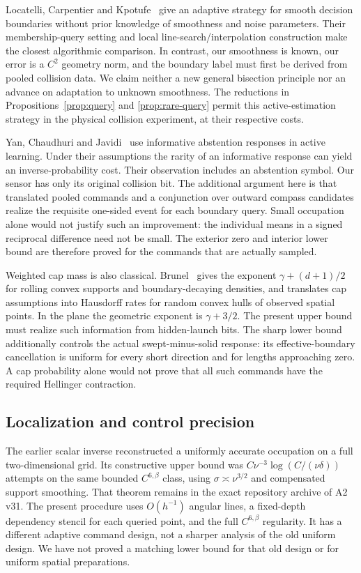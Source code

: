 Locatelli, Carpentier and Kpotufe~\cite{LCK} give an adaptive strategy
for smooth decision boundaries without prior knowledge of smoothness
and noise parameters. Their membership-query setting and local
line-search/interpolation construction make the closest algorithmic
comparison. In contrast, our smoothness is known, our error is a $C^2$
geometry norm, and the boundary label must first be derived from
pooled collision data. We claim neither a new general
bisection principle nor an advance on adaptation to unknown smoothness.
The reductions in Propositions~\ref{prop:query} and
\ref{prop:rare-query} permit this active-estimation strategy in the
physical collision experiment, at their respective costs.

Yan, Chaudhuri and Javidi~\cite{YCJ} use informative abstention
responses in active learning. Under their assumptions the rarity of
an informative response can yield an inverse-probability cost. Their
observation includes an abstention symbol. Our sensor has only its
original collision bit. The additional argument here is that translated
pooled commands and a conjunction over outward compass candidates
realize the requisite one-sided event for each boundary query. Small
occupation alone would not justify such an improvement: the individual
means in a signed reciprocal difference need not be small. The exterior
zero and interior lower bound are therefore proved for the commands
that are actually sampled.

Weighted cap mass is also classical. Brunel~\cite{BrunelCaps} gives
the exponent $\gamma+(d+1)/2$ for rolling convex supports and
boundary-decaying densities, and translates cap assumptions into
Hausdorff rates for random convex hulls of observed spatial points.
In the plane the geometric exponent is $\gamma+3/2$. The present
upper bound must realize such information from hidden-launch bits.
The sharp lower bound additionally controls the actual swept-minus-solid
response: its effective-boundary cancellation is uniform for every
short direction and for lengths approaching zero. A cap probability
alone would not prove that all such commands have the required
Hellinger contraction.

\subsection{Localization and control precision}

The earlier scalar inverse reconstructed a uniformly accurate occupation
on a full two-dimensional grid. Its constructive upper bound was
$C\nu^{-3}\log(C/(\nu\delta))$ attempts on the same bounded
$C^{6,\beta}$ class, using $\sigma\asymp\nu^{3/2}$ and compensated
support smoothing. That theorem remains in the exact repository archive of A2 v31. The present
procedure uses $O(h^{-1})$ angular lines, a fixed-depth dependency
stencil for each queried point, and the full $C^{6,\beta}$ regularity.
It has a different adaptive command design, not a sharper analysis of
the old uniform design. We have not proved a matching lower bound
for that old design or for uniform spatial preparations.

